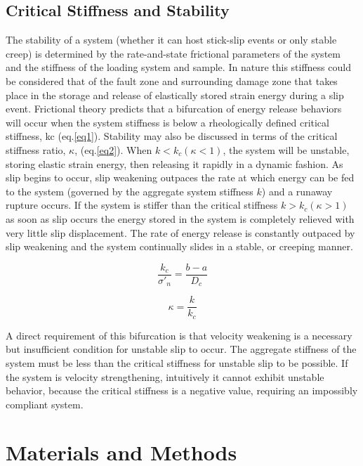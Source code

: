 \subsection{Critical Stiffness and Stability}
The stability of a system (whether it can host stick-slip events or only stable creep) is determined by the rate-and-state frictional parameters of the system and the stiffness of the loading system and sample. In nature this stiffness could be considered that of the fault zone and surrounding damage zone that takes place in the storage and release of elastically stored strain energy during a slip event. Frictional theory predicts that a bifurcation of energy release behaviors will occur when the system stiffness is below a rheologically defined critical stiffness, kc (eq.\ref{eq1}). Stability may also be discussed in terms of the critical stiffness ratio, $\kappa$, (eq.\ref{eq2}). When $k < k_c (\kappa<1)$, the system will be unstable, storing elastic strain energy, then releasing it rapidly in a dynamic fashion. As slip begins to occur, slip weakening outpaces the rate at which energy can be fed to the system (governed by the aggregate system stiffness $k$) and a runaway rupture occurs. If the system is stiffer than the critical stiffness $k>k_c (\kappa>1)$ as soon as slip occurs the energy stored in the system is completely relieved with very little slip displacement. The rate of energy release is constantly outpaced by slip weakening and the system continually slides in a stable, or creeping manner.

\begin{equation}
	\frac{k_c}{\sigma'_n} = \frac{b-a}{D_c}
	\label{eq1}
\end{equation}

\begin{equation}
	\kappa = \frac{k}{k_c}
	\label{eq2}
\end{equation}

A direct requirement of this bifurcation is that velocity weakening is a necessary but insufficient condition for unstable slip to occur. The aggregate stiffness of the system must be less than the critical stiffness for unstable slip to be possible. If the system is velocity strengthening, intuitively it cannot exhibit unstable behavior, because the critical stiffness is a negative value, requiring an impossibly compliant system.

\section{Materials and Methods}
